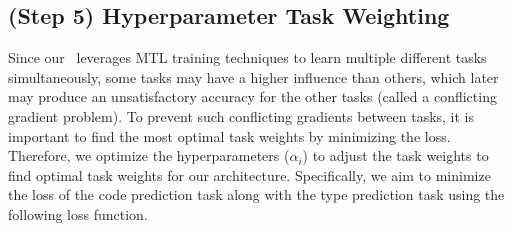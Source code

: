     




\subsection{(Step 5) Hyperparameter Task Weighting}
\label{sec:approach-weight}

Since our \our~leverages MTL training techniques to learn multiple different tasks simultaneously, some tasks may have a higher influence than others, which later may produce an unsatisfactory accuracy for the other tasks (called a conflicting gradient problem).
To prevent such conflicting gradients between tasks, it is important to find the most optimal task weights by minimizing the loss.
Therefore, we optimize the hyperparameters ($\alpha_i$) to adjust the task weights to find optimal task weights for our architecture.
Specifically, we aim to minimize the loss of the code prediction task along with the type prediction task using the following loss function.


